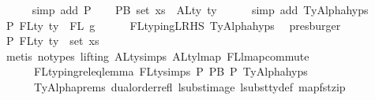 \begin{isabellebody}
\ \ \ \ \isamarkupfalse%
\ {\isacharparenleft}{\kern0pt}simp\ add{\isacharcolon}{\kern0pt}\ P{}{\isacharparenright}{\kern0pt}\isanewline
\isanewline
\ \ \isamarkupfalse%
\ P{}{}B{\isacharcolon}{\kern0pt}\ {\isachardoublequoteopen}set\ xs{\isacharprime}{\kern0pt}\ {\isacharequal}{\kern0pt}\ ALty\ ty{\isacharprime}{\kern0pt}{\isachardoublequoteclose}\isanewline
\ \ \ \ \isamarkupfalse%
\ {\isacharparenleft}{\kern0pt}simp\ add{\isacharcolon}{\kern0pt}\ TyAlpha{\isachardot}{\kern0pt}hyps{\isacharparenleft}{\kern0pt}{}{\isacharparenright}{\kern0pt}{\isacharparenright}{\kern0pt}\isanewline
\isanewline
\ \ \isamarkupfalse%
\ P{}{}{\isacharcolon}{\kern0pt}\ {\isachardoublequoteopen}FLty\ ty{\isacharprime}{\kern0pt}\ {\isacharequal}{\kern0pt}\ FL\ g{\isachardoublequoteclose}\isanewline
\ \ \ \ \isamarkupfalse%
\ FL{\isacharunderscore}{\kern0pt}typing{\isacharunderscore}{\kern0pt}LRHS\ TyAlpha{\isachardot}{\kern0pt}hyps{\isacharparenleft}{\kern0pt}{}{\isacharparenright}{\kern0pt}\ \isamarkupfalse%
\ presburger\isanewline
\ \ \isamarkupfalse%
\ \isamarkupfalse%
\ P{}{}{\isacharcolon}{\kern0pt}\ {\isachardoublequoteopen}FLty\ ty{\isacharprime}{\kern0pt}\ {\isacharequal}{\kern0pt}\ set\ xs{\isacharprime}{\kern0pt}{\isachardoublequoteclose}\isanewline
\ \ \ \ \isamarkupfalse%
\ {\isacharparenleft}{\kern0pt}metis\ {\isacharparenleft}{\kern0pt}no{\isacharunderscore}{\kern0pt}types{\isacharcomma}{\kern0pt}\ lifting{\isacharparenright}{\kern0pt}\ ALty{\isachardot}{\kern0pt}simps{\isacharparenleft}{\kern0pt}{}{\isacharparenright}{\kern0pt}\ ALty{\isacharunderscore}{\kern0pt}lmap\ FL{\isacharunderscore}{\kern0pt}lmap{\isacharunderscore}{\kern0pt}commute\isanewline
\ \ \ \ \ \ FL{\isacharunderscore}{\kern0pt}typing{\isacharunderscore}{\kern0pt}rel{\isacharunderscore}{\kern0pt}eq{\isacharunderscore}{\kern0pt}lemma{}\ FLty{\isachardot}{\kern0pt}simps{\isacharparenleft}{\kern0pt}{}{\isacharparenright}{\kern0pt}\ P{}\ P{}{}B\ P{}\ TyAlpha{\isachardot}{\kern0pt}hyps{\isacharparenleft}{\kern0pt}{}{\isacharcomma}{\kern0pt}{}{\isacharcomma}{\kern0pt}{}{\isacharparenright}{\kern0pt}\isanewline
\ \ \ \ \ \ TyAlpha{\isachardot}{\kern0pt}prems{\isacharparenleft}{\kern0pt}{}{\isacharparenright}{\kern0pt}\ dual{\isacharunderscore}{\kern0pt}order{\isachardot}{\kern0pt}refl\ lsubst{\isacharunderscore}{\kern0pt}image\ lsubst{\isacharunderscore}{\kern0pt}ty{\isacharunderscore}{\kern0pt}def\ map{\isacharunderscore}{\kern0pt}fst{\isacharunderscore}{\kern0pt}zip\isanewline

\end{isabellebody}
